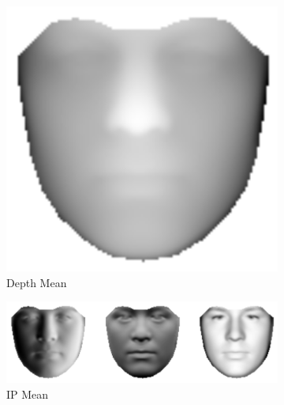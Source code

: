 \begin{figure}[t]
    \centering
    \hspace*{\fill}
    \begin{subfigure}[b]{0.25\textwidth}
        \includegraphics[width=\textwidth]{statistical_normals/images/lk2d/depth_aam_mean.png}
        \caption{Depth Mean}\label{subfig:singl_img_depth_aam_mean}
    \end{subfigure} \hfill
    \begin{subfigure}[b]{0.4\textwidth}
        \includegraphics[width=\textwidth]{statistical_normals/images/lk2d/normals_aam_mean.png}
        \caption{IP Mean}\label{subfig:singl_img_ip_aam_mean}
    \end{subfigure} \hfill
    \begin{subfigure}[b]{0.25\textwidth}

\end{subfigure}
\end{figure}
